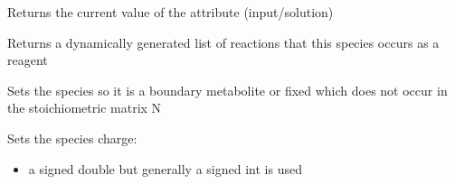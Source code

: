 \documentclass[letterpaper,10pt,english]{sphinxmanual}
\begin{document}
\begin{fulllineitems}
\begin{fulllineitems}
\end{fulllineitems}


\begin{fulllineitems}
\label{\detokenize{modules_doc:cbmpy.CBModel.Species.getValue}}
\pysigstartsignatures
{}
\pysigstopsignatures
\sphinxAtStartPar
Returns the current value of the attribute (input/solution)

\end{fulllineitems}


\begin{fulllineitems}
\label{\detokenize{modules_doc:cbmpy.CBModel.Species.isReagentOf}}
\pysigstartsignatures
{}
\pysigstopsignatures
\sphinxAtStartPar
Returns a dynamically generated list of reactions that this species occurs as a reagent

\end{fulllineitems}


\begin{fulllineitems}
\label{\detokenize{modules_doc:cbmpy.CBModel.Species.setBoundary}}
\pysigstartsignatures
{}
\pysigstopsignatures
\sphinxAtStartPar
Sets the species so it is a boundary metabolite or fixed which does not occur in the stoichiometric matrix N

\end{fulllineitems}


\begin{fulllineitems}
\label{\detokenize{modules_doc:cbmpy.CBModel.Species.setCharge}}
\pysigstartsignatures
{}
\pysigstopsignatures
\sphinxAtStartPar
Sets the species charge:
\begin{itemize}
\item {} 
\sphinxAtStartPar
{} a signed double but generally a signed int is used


\end{itemize}
\end{fulllineitems}
\end{fulllineitems}
\end{document}
